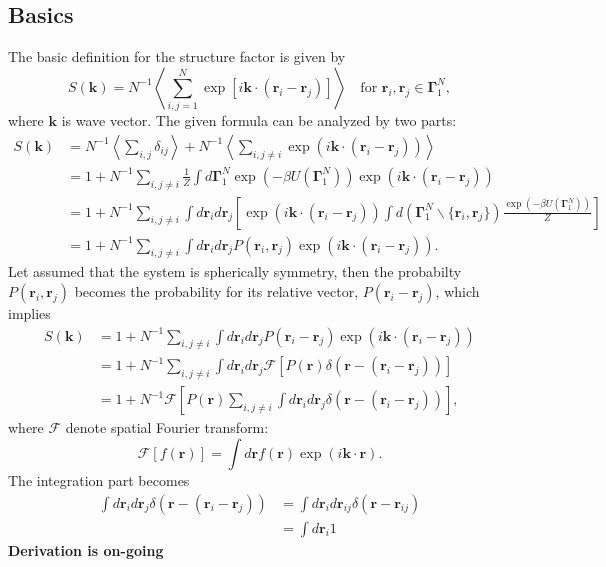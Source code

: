 \documentclass[10pt, a4paper]{article}
\begin{document}
\begin{appendices}
    \subsection{Basics}
    The basic definition for the structure factor is given by
    \begin{equation}
      S(\mathbf{k}) = N^{-1}\left\langle \sum_{i,j=1}^{N}\exp\left[i\mathbf{k}\cdot(\mathbf{r}_i - \mathbf{r}_j)\right] \right\rangle\quad\textrm{for }\mathbf{r}_i,\mathbf{r}_j\in\boldsymbol{\Gamma}_{1}^{N},
    \end{equation}
    where $\mathbf{k}$ is wave vector. The given formula can be analyzed by two parts:
    \begin{align}
      S(\mathbf{k}) &= N^{-1}\left\langle \sum_{i,j}\delta_{ij}\right\rangle + N^{-1}\left\langle \sum_{i, j\neq i}\exp(i\mathbf{k}\cdot(\mathbf{r}_i - \mathbf{r}_j))\right\rangle \\
                    &= 1 + N^{-1}\sum_{i,j\neq i}\frac{1}{Z}\int d\boldsymbol{\Gamma}_{1}^{N}\exp(-\beta U(\boldsymbol{\Gamma}_{1}^{N}))\exp(i\mathbf{k}\cdot(\mathbf{r}_i-\mathbf{r}_j))\\
                    &= 1 + N^{-1}\sum_{i, j\neq i}\int d\mathbf{r}_i d\mathbf{r}_j\left[\exp(i\mathbf{k}\cdot(\mathbf{r}_i-\mathbf{r}_j)) \int d\left(\boldsymbol{\Gamma}_{1}^{N}\backslash\{\mathbf{r}_i,\mathbf{r}_j\}\right)\frac{\exp(-\beta U(\boldsymbol{\Gamma}_{1}^{N}))}{Z}\right]\\
                    &= 1 + N^{-1}\sum_{i,j\neq i}\int d\mathbf{r}_i d\mathbf{r}_j P(\mathbf{r}_i, \mathbf{r}_j) \exp(i\mathbf{k}\cdot(\mathbf{r}_i - \mathbf{r}_j)).
    \end{align}
    Let assumed that the system is spherically symmetry, then the probabilty $P(\mathbf{r}_i, \mathbf{r}_j)$ becomes the probability for its relative vector, $P(\mathbf{r}_i-\mathbf{r}_j)$, which implies
    \begin{align}
      S(\mathbf{k}) &= 1 + N^{-1}\sum_{i,j\neq i}\int d\mathbf{r}_i d\mathbf{r}_j P(\mathbf{r}_i - \mathbf{r}_j)\exp(i\mathbf{k}\cdot(\mathbf{r}_i - \mathbf{r}_j)) \\
      &= 1 + N^{-1}\sum_{i,j\neq i}\int d\mathbf{r}_i d\mathbf{r}_j  \mathscr{F}\left[P(\mathbf{r})\delta(\mathbf{r} - (\mathbf{r}_i - \mathbf{r}_j)) \right] \\
      &= 1 + N^{-1}\mathscr{F}\left[P(\mathbf{r}) \sum_{i,j\neq i}\int d\mathbf{r}_i d\mathbf{r}_j \delta(\mathbf{r} - (\mathbf{r}_i - \mathbf{r}_j)) \right],
    \end{align}
    where $\mathscr{F}$ denote spatial Fourier transform:
    \begin{equation}
      \mathscr{F}[f(\mathbf{r})] = \int d\mathbf{r} f(\mathbf{r})\exp(i\mathbf{k}\cdot\mathbf{r}).
    \end{equation}
    The integration part becomes
    \begin{align}
      \int d\mathbf{r}_i d\mathbf{r}_j \delta(\mathbf{r} - (\mathbf{r}_i - \mathbf{r}_j)) &= \int d\mathbf{r}_i d\mathbf{r}_{ij} \delta(\mathbf{r} - \mathbf{r}_{ij}) \\
      &= \int d\mathbf{r}_i 1
    \end{align}
    \textbf{Derivation is on-going}

\end{appendices}
\end{document}
